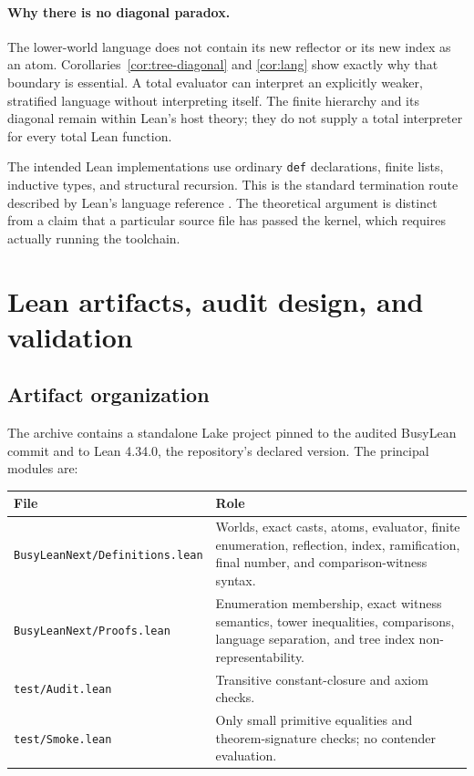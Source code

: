 \documentclass[11pt]{article}
\theoremstyle{definition}
\theoremstyle{remark}
\newcommand{\code}[1]{\texttt{#1}}
\begin{document}
\paragraph{Why there is no diagonal paradox.}
The lower-world language does not contain its new reflector or its new index
as an atom. Corollaries~\ref{cor:tree-diagonal} and \ref{cor:lang} show exactly
why that boundary is essential. A total evaluator can interpret an explicitly
weaker, stratified language without interpreting itself. The finite
hierarchy and its diagonal remain within Lean's host theory; they do not
supply a total interpreter for every total Lean function.

The intended Lean implementations use ordinary \code{def} declarations,
finite lists, inductive types, and structural recursion. This is the standard
termination route described by Lean's language reference \cite{leanrec}.
The theoretical argument is distinct from a claim that a particular source
file has passed the kernel, which requires actually running the toolchain.

\section{Lean artifacts, audit design, and validation}\label{sec:validation}

\subsection{Artifact organization}

The archive contains a standalone Lake project pinned to the audited BusyLean
commit and to Lean 4.34.0, the repository's declared version. The principal
modules are:

\begin{center}
\small
\begin{tabularx}{\linewidth}{@{}l X@{}}
\toprule
File & Role\\
\midrule
\code{BusyLeanNext/Definitions.lean} & Worlds, exact casts, atoms, evaluator,
finite enumeration, reflection, index, ramification, final number, and
comparison-witness syntax.\\
\code{BusyLeanNext/Proofs.lean} & Enumeration membership, exact witness
semantics, tower inequalities, comparisons, language separation, and tree
index non-representability.\\
\code{test/Audit.lean} & Transitive constant-closure and axiom checks.\\
\code{test/Smoke.lean} & Only small primitive equalities and theorem-signature
checks; no contender evaluation.\\
\bottomrule
\end{tabularx}
\end{center}
\end{document}

